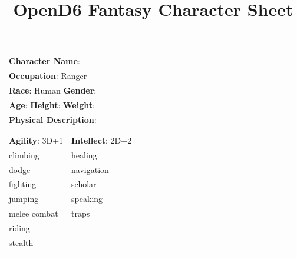 \documentclass[10pt]{article}
\title{OpenD6 Fantasy Character Sheet}
\begin{document}
\pagestyle{fancy}
\fancyhf{}
\fancyfoot[R]{\thepage}
\renewcommand{\headrulewidth}{0pt}


\cleardoublepage
\begin{table}
\begin{tabular}{m{156pt} m{156pt} m{156pt}}
    \multicolumn{2}{l}{\textbf{Character Name}:  \hrulefill} \\
    \multicolumn{2}{l}{\textbf{Occupation}: Ranger \hrulefill} \\
    \multicolumn{2}{l}{\textbf{Race}: Human \hrulefill \hspace{1em} \textbf{Gender}:  \hrulefill} \\
    \multicolumn{2}{l}{\textbf{Age}:  \hrulefill \hspace{1em} \textbf{Height}:  \hrulefill \hspace{1em}  \textbf{Weight}:  \hrulefill } \\
    \multicolumn{2}{l}{\textbf{Physical Description}:  \hrulefill } \\
    \multicolumn{2}{l}{ \hrulefill } \\
 & & \\
\textbf{Agility}: 3D+1 \hrulefill      & \textbf{Intellect}: 2D+2 \hrulefill  &                             \\

climbing             \hrulefill & healing              \hrulefill & \\

dodge                \hrulefill & navigation           \hrulefill & \\

fighting             \hrulefill & scholar              \hrulefill & \\

jumping              \hrulefill & speaking             \hrulefill & \\

melee combat         \hrulefill & traps                \hrulefill & \\

riding               \hrulefill &  \hrulefill & \\

stealth              \hrulefill &  \hrulefill & \\

 \hrulefill &  \hrulefill & \\


\end{tabular}
\end{table}
\end{document}
